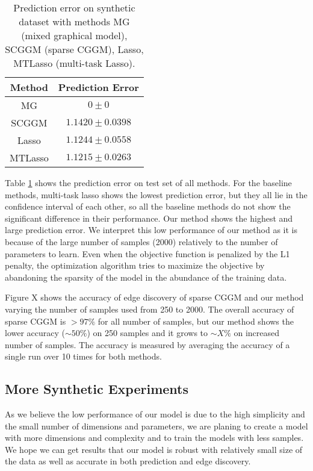 \documentclass{article}
\begin{document}
\begin{table}
    \label{table:syn_pred_err}
    	\caption{Prediction error on synthetic dataset with methods MG (mixed graphical model), SCGGM (sparse CGGM), Lasso, MTLasso (multi-task Lasso).}
\begin{center}
    \begin{tabular}{| c | c |}
    \hline
    Method & Prediction Error \\
    \hline
    MG & $0 \pm 0$ \\
    SCGGM & $1.1420 \pm 0.0398$  \\
    Lasso & $1.1244 \pm 0.0558$  \\
    MTLasso & $1.1215 \pm 0.0263$ \\
    \hline 
    \end{tabular}
\end{center}
\end{table}
Table \ref{table:syn_pred_err} shows the prediction error on test set of all methods. For the baseline methods, multi-task lasso shows the lowest prediction error, but they all lie in the confidence interval of each other, so all the baseline methods do not show the significant difference in their performance. Our method shows the highest and large prediction error. We interpret this low performance of our method as it is because of the large number of samples (2000) relatively to the number of parameters to learn. Even when the objective function is penalized by the L1 penalty, the optimization algorithm tries to maximize the objective by abandoning the sparsity of the model in the abundance of the training data.

Figure X shows the accuracy of edge discovery of sparse CGGM and our method varying the number of samples used from 250 to 2000. The overall accuracy of sparse CGGM is $> 97\%$ for all number of samples, but our method shows the lower accuracy ($\sim 50\%$) on 250 samples and it grows to $\sim X\%$ on increased number of samples. The accuracy is measured by averaging the accuracy of a single run over 10 times for both methods.

\subsection{More Synthetic Experiments}
As we believe the low performance of our model is due to the high simplicity and the small number of dimensions and parameters, we are planing to create a model with more dimensions and complexity and to train the models with less samples. We hope we can get results that our model is robust with relatively small size of the data as well as accurate in both prediction and edge discovery.
\end{document}
